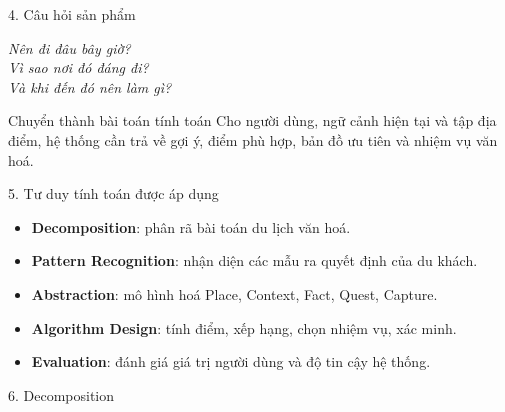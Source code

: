 \documentclass[aspectratio=169]{beamer}
\begin{document}
\begin{frame}{4. Câu hỏi sản phẩm}
\begin{center}
\Large
\textit{Nên đi đâu bây giờ?\\ Vì sao nơi đó đáng đi?\\ Và khi đến đó nên làm gì?}
\end{center}
\vspace{0.3cm}
\begin{block}{Chuyển thành bài toán tính toán}
Cho người dùng, ngữ cảnh hiện tại và tập địa điểm, hệ thống cần trả về gợi ý, điểm phù hợp, bản đồ ưu tiên và nhiệm vụ văn hoá.
\end{block}
\end{frame}

\begin{frame}{5. Tư duy tính toán được áp dụng}
\begin{itemize}
    \item \textbf{Decomposition}: phân rã bài toán du lịch văn hoá.
    \item \textbf{Pattern Recognition}: nhận diện các mẫu ra quyết định của du khách.
    \item \textbf{Abstraction}: mô hình hoá Place, Context, Fact, Quest, Capture.
    \item \textbf{Algorithm Design}: tính điểm, xếp hạng, chọn nhiệm vụ, xác minh.
    \item \textbf{Evaluation}: đánh giá giá trị người dùng và độ tin cậy hệ thống.
\end{itemize}
\end{frame}

\begin{frame}{6. Decomposition}
\end{frame}
\end{document}
